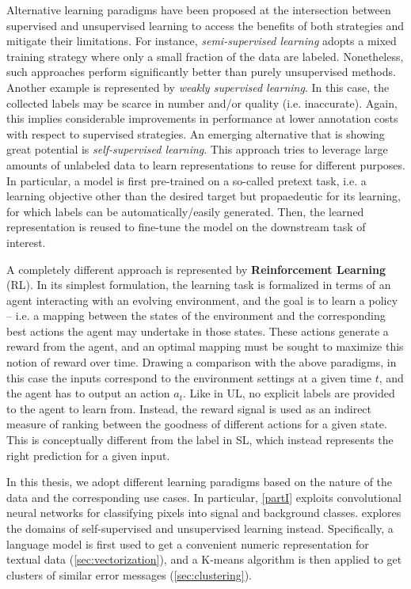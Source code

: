 Alternative learning paradigms have been proposed at the intersection between supervised and unsupervised learning to access the benefits of both strategies and mitigate their limitations.
For instance, \textit{semi-supervised learning} adopts a mixed training strategy where only a small fraction of the data are labeled. Nonetheless, such approaches perform significantly better than purely unsupervised methods.
Another example is represented by \textit{weakly supervised learning}. In this case, the collected labels may be scarce in number and/or quality (i.e. inaccurate). Again, this implies considerable improvements in performance at lower annotation costs with respect to supervised strategies. 
An emerging alternative that is showing great potential is \textit{self-supervised learning}. This approach tries to leverage large amounts of unlabeled data to learn representations to reuse for different purposes. In particular, a model is first pre-trained on a so-called pretext task, i.e. a learning objective other than the desired target but propaedeutic for its learning, for which labels can be automatically/easily generated. Then, the learned representation is reused to fine-tune the model on the downstream task of interest.

A completely different approach is represented by \textbf{Reinforcement Learning} (RL). In its simplest formulation, the learning task is formalized in terms of an agent interacting with an evolving environment, and the goal is to learn a policy -- i.e. a mapping between the states of the environment and the corresponding best actions the agent may undertake in those states.
These actions generate a reward from the agent, and an optimal mapping must be sought to maximize this notion of reward over time.
Drawing a comparison with the above paradigms, in this case the inputs correspond to the environment settings at a given time $t$, and the agent has to output an action $a_t$.
Like in UL, no explicit labels are provided to the agent to learn from.
Instead, the reward signal is used as an indirect measure of ranking between the goodness of different actions for a given state. This is conceptually different from the label in SL, which instead represents the right prediction for a given input.

In this thesis, we adopt different learning paradigms based on the nature of the data and the corresponding use cases.
In particular, \cref{partI} exploits convolutional neural networks for classifying pixels into signal and background classes.
 explores the domains of self-supervised and unsupervised learning instead. Specifically, a language model is first used to get a convenient numeric representation for textual data (\cref{sec:vectorization}), and a K-means algorithm is then applied to get clusters of similar error messages (\cref{sec:clustering}).